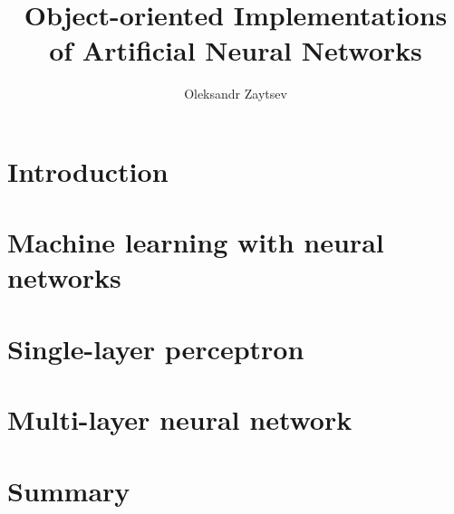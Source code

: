 \documentclass[a4paper, 12pt, oneside]{book}
\title{Object-oriented Implementations \\
       of Artificial Neural Networks}
\author{Oleksandr Zaytsev}
\begin{document}
  \maketitle
  \tableofcontents
  
  \chapter{Introduction}
  
  
  \chapter{Machine learning with neural networks}
  
  
  \chapter{Single-layer perceptron}
  
  
  \chapter{Multi-layer neural network}
  
  
  \chapter*{Summary}
  
  
%   
  
  
\end{document}
